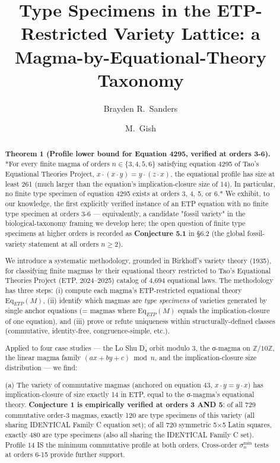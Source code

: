 \documentclass[11pt,reqno]{amsart}
\title[Type Specimens in the ETP-Restricted Var]{Type Specimens in the ETP-Restricted Variety Lattice: a Magma-by-Equational-Theory Taxonomy}
\author{Brayden R.\ Sanders}
\author{M.\ Gish}
\theoremstyle{plain}
\theoremstyle{definition}
\begin{document}
\maketitle


\begin{abstract}

\textbf{Theorem 1 (Profile lower bound for Equation 4295, verified at orders 3-6).} *For every finite magma of orders $n \in \{3, 4, 5, 6\}$ satisfying equation 4295 of Tao's Equational Theories Project, $x \cdot (x \cdot y) = y \cdot (z \cdot x)$, the equational profile has size at least 261 (much larger than the equation's implication-closure size of 14). In particular, no finite type specimen of equation 4295 exists at orders 3, 4, 5, or 6.* We exhibit, to our knowledge, the first explicitly verified instance of an ETP equation with no finite type specimen at orders 3-6 --- equivalently, a candidate "fossil variety" in the biological-taxonomy framing we develop here; the open question of finite type specimens at higher orders is recorded as \textbf{Conjecture 5.1} in §6.2 (the global fossil-variety statement at all orders $n \geq 2$).

We introduce a systematic methodology, grounded in Birkhoff's variety theory (1935), for classifying finite magmas by their equational theory restricted to Tao's Equational Theories Project (ETP, 2024–2025) catalog of 4,694 equational laws. The methodology has three steps: (i) compute each magma's ETP-restricted equational theory $\mathrm{Eq}_{ETP}(M)$, (ii) identify which magmas are \textit{type specimens} of varieties generated by single anchor equations (= magmas where $\mathrm{Eq}_{ETP}(M)$ equals the implication-closure of one equation), and (iii) prove or refute uniqueness within structurally-defined classes (commutative, identity-free, congruence-simple, etc.).

Applied to four case studies --- the Lo Shu D₄ orbit modulo 3, the σ-magma on $\mathbb{Z}/10\mathbb{Z}$, the linear magma family $(ax+by+c) \bmod n$, and the implication-closure size distribution --- we find:

(a) The variety of commutative magmas (anchored on equation 43, $x \cdot y = y \cdot x$) has implication-closure of size exactly 14 in ETP, equal to the σ-magma's equational theory. \textbf{Conjecture 1 is empirically verified at orders 3 AND 5}: of all 729 commutative order-3 magmas, exactly 120 are type specimens of this variety (all sharing IDENTICAL Family C equation set); of all 720 symmetric 5×5 Latin squares, exactly 480 are type specimens (also all sharing the IDENTICAL Family C set). Profile 14 IS the minimum commutative profile at both orders. Cross-order $\sigma_n^{\min}$ tests at orders 6-15 provide further support.


\end{abstract}
\end{document}
